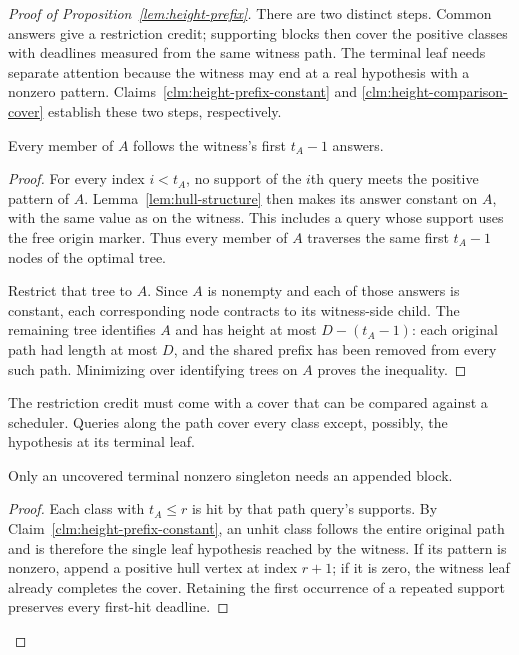 \begin{proof}[Proof of Proposition~\ref{lem:height-prefix}]
There are two distinct steps. Common answers give a restriction credit;
supporting blocks then cover the positive classes with deadlines measured
from the same witness path. The terminal leaf needs separate attention
because the witness may end at a real hypothesis with a nonzero pattern.
Claims~\ref{clm:height-prefix-constant} and
\ref{clm:height-comparison-cover} establish these two steps, respectively.

\begin{claim}
\label{clm:height-prefix-constant}
Every member of $A$ follows the witness's first $t_A-1$ answers.
\end{claim}
\begin{proof}
For every index $i<t_A$, no support of the $i$th query meets the positive
pattern of $A$. Lemma~\ref{lem:hull-structure} then makes its answer
constant on $A$, with the same value as on the witness. This includes a
query whose support uses the free origin marker. Thus every member of $A$
traverses the same first $t_A-1$ nodes of the optimal tree.

Restrict that tree to $A$. Since $A$ is nonempty and each of those answers
is constant, each corresponding node contracts to its witness-side child.
The remaining tree identifies $A$ and has height at most
$D-(t_A-1)$: each original path had length at most $D$, and the shared
prefix has been removed from every such path. Minimizing over identifying
trees on $A$ proves the inequality.

\end{proof}
The restriction credit must come with a cover that can be compared
against a scheduler. Queries along the path cover every class except,
possibly, the hypothesis at its terminal leaf.

\begin{claim}
\label{clm:height-comparison-cover}
Only an uncovered terminal nonzero singleton needs an appended block.
\end{claim}
\begin{proof}
Each class with $t_A\le r$ is hit by that path query's supports.
By Claim~\ref{clm:height-prefix-constant}, an unhit class follows
the entire original path and is therefore the
single leaf hypothesis reached by the witness. If its pattern is
nonzero, append a positive hull vertex at index $r+1$; if it is zero,
the witness leaf already completes the cover. Retaining the first
occurrence of a repeated support preserves every first-hit deadline.
\end{proof}
\end{proof}

